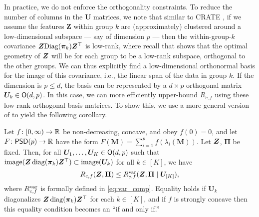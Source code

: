 \documentclass[\toplevelprefix/book-main.tex]{subfiles}
\begin{document}
In practice, we do not enforce the orthogonality constraints. To reduce the number of columns in the $\bm U$ matrices, we note that similar to CRATE \citep{yu2023white}, if we assume the features $\bm Z$ within group \(k\) are (approximately) clustered around a low-dimensional subspace --- say of dimension \(p\) --- then the within-group-\(k\) covariance \(\bm{Z}\mathrm{Diag}(\bm \pi_{k})\bm{Z}^{\top}\) is low-rank, where recall that \cite{yu2020learning} shows that the optimal geometry of $\bm{Z}$ will be for each group to be a low-rank subspace, orthogonal to the other groups. We can thus explicitly find a low-dimensional orthonormal basis for the image of this covariance, i.e., the linear span of the data in group \(k\). If the dimension is $p \leq d$, the basis can be represented by a $d\times p$ orthogonal matrix $\bm U_k \in \mathsf{O}(d, p)$. In this case, we can more efficiently upper-bound \(R_{c,f}\) using these low-rank orthogonal basis matrices. To show this, we use a more general version of   to yield the following corollary.
\begin{corollary}\label{cor:var_concave_logdet}
    Let \(f \colon [0, \infty) \to \mathbb{R}\) be non-decreasing, concave, and obey \(f(0) = 0\), and let \(F \colon \mathsf{PSD}(p) \to \mathbb{R}\) have the form \(F(\bm M) = \sum_{i = 1}^{p}f(\lambda_{i}(\bm M))\). Let \(\bm{Z}\), \(\bm \Pi\) be fixed. Then, for all \(\bm U_{1}, \dots, \bm U_{K} \in \mathsf{O}(d, p)\) such that \(\mathrm{image}(\bm{Z}\operatorname{diag}(\bm \pi_{k})\bm{Z}^{\top}) \subset \mathrm{image}(\bm U_{k})\) for all \(k \in [K]\), we have
    \begin{equation}
        R_{c, f}(\bm{Z}, \bm\Pi) \leq R_{c, f}^{\rm var}(\bm{Z}, \bm\Pi \mid \bm U_{[K]}), 
    \end{equation}
     where \(R_{c, f}^{\rm var}\) is formally defined in \eqref{eq:var_comp}. Equality holds if \(\bm U_{k}\) diagonalizes \(\bm{Z}\operatorname{diag}(\bm \pi_{k})\bm{Z}^{\top}\) for each \(k \in [K]\), and if \(f\) is strongly concave then this equality condition becomes an ``if and only if.''
\end{corollary}
\end{document}
